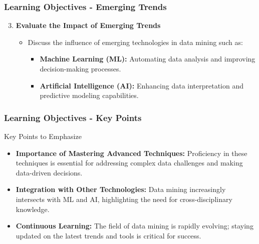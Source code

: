 \documentclass{beamer}
\begin{document}
\begin{frame}[fragile]
    \frametitle{Learning Objectives - Emerging Trends}
    \begin{enumerate}
        \setcounter{enumi}{2} %
        \item \textbf{Evaluate the Impact of Emerging Trends}
            \begin{itemize}
                \item Discuss the influence of emerging technologies in data mining such as:
                    \begin{itemize}
                        \item \textbf{Machine Learning (ML):} Automating data analysis and improving decision-making processes.
                        \item \textbf{Artificial Intelligence (AI):} Enhancing data interpretation and predictive modeling capabilities.
                    \end{itemize}
            \end{itemize}
    \end{enumerate}
\end{frame}

\begin{frame}[fragile]
    \frametitle{Learning Objectives - Key Points}
    \begin{block}{Key Points to Emphasize}
        \begin{itemize}
            \item \textbf{Importance of Mastering Advanced Techniques:} Proficiency in these techniques is essential for addressing complex data challenges and making data-driven decisions.
            \item \textbf{Integration with Other Technologies:} Data mining increasingly intersects with ML and AI, highlighting the need for cross-disciplinary knowledge.
            \item \textbf{Continuous Learning:} The field of data mining is rapidly evolving; staying updated on the latest trends and tools is critical for success.
        \end{itemize}
    \end{block}
\end{frame}
\end{document}
